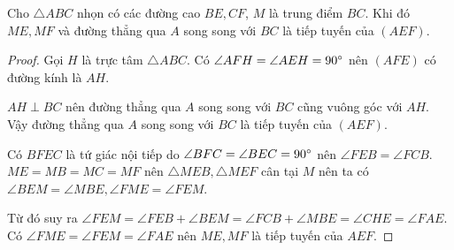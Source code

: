 \begin{lemma}
	Cho $\triangle ABC$ nhọn có các đường cao $BE, CF$, $M$ là trung điểm $BC$. Khi đó $ME, MF$ và đường thẳng qua $A$ song song với $BC$ là tiếp tuyến của $(AEF)$.
\end{lemma}

\begin{center}
	
\end{center}

\begin{proof}
	Gọi $H$ là trực tâm $\triangle ABC$.
	Có $\angle AFH = \angle AEH = 90 \degree$ nên $(AFE)$ có đường kính là $AH$.

	$AH \perp BC$ nên đường thẳng qua $A$ song song với $BC$ cũng vuông góc với $AH$. Vậy đường thẳng qua $A$ song song với $BC$ là tiếp tuyến của $(AEF)$.

	Có $BFEC$ là tứ giác nội tiếp do $\angle BFC = \angle BEC = 90 \degree$ nên $\angle FEB = \angle FCB$. $ME = MB = MC = MF$ nên $\triangle MEB, \triangle MEF$ cân tại $M$ nên ta có $\angle BEM = \angle MBE, \angle FME = \angle FEM$.

	Từ đó suy ra $\angle FEM = \angle FEB + \angle BEM = \angle FCB + \angle MBE = \angle CHE = \angle FAE$. Có $\angle FME = \angle FEM = \angle FAE$ nên $ME, MF$ là tiếp tuyến của $AEF$.
\end{proof}